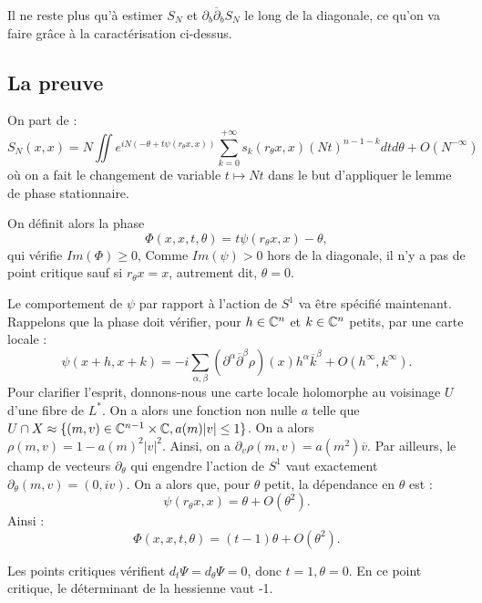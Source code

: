 Il ne reste plus qu'à estimer $S_N$ et $\partial_b \overline{\partial}_bS_N$ le long de la diagonale, ce qu'on va faire grâce à la caractérisation ci-dessus.

\subsection{La preuve}
On part de :
\begin{equation*}
	S_N(x,x)=N\iint e^{iN(-\theta + t\psi(r_{\theta}x,x))}\sum_{k=0}^{+\infty}s_k(r_{\theta}x,x)(Nt)^{n-1-k}dtd\theta + O(N^{-\infty})
\end{equation*}
où on a fait le changement de variable $t \mapsto Nt$ dans le but d'appliquer le lemme de phase stationnaire.

On définit alors la phase
\begin{equation*}
	\Phi(x,x,t,\theta)=t\psi(r_{\theta}x,x)-\theta,
\end{equation*}
qui vérifie $Im(\Phi) \geq 0$, Comme $Im(\psi) > 0$ hors de la diagonale, il n'y a pas de point critique sauf si $r_{\theta}x=x$, autrement dit, $\theta=0$.

Le comportement de $\psi$ par rapport à l'action de $S^1$ va être spécifié maintenant. Rappelons que la phase doit vérifier, pour $h\in \mathbb{C}^n$ et $k \in \mathbb{C}^n$ petits, par une carte locale :
\begin{equation}
  \psi(x+h,x+k) =-i\sum_{\alpha,\beta}(\partial^{\alpha}\overline{\partial}^{\beta}\rho)(x)h^{\alpha}\overline{k}^{\beta} + O(h^{\infty},k^{\infty}).
\end{equation}
Pour clarifier l'esprit, donnons-nous une carte locale holomorphe au voisinage $U$ d'une fibre de $L^*$. On a alors une fonction non nulle $a$ telle que $U \cap X \approx \{(m,v)\in \mathbb{C}^{n-1}\times \mathbb{C}, a(m)|v|\leq 1\}$. On a alors $\rho(m,v)=1-a(m)^2|v|^2$. Ainsi, on a $\partial_v \rho(m,v) = a(m^2)\overline{v}$.
Par ailleurs, le champ de vecteurs $\partial_{\theta}$ qui engendre l'action de $S^1$ vaut exactement $\partial_{\theta}(m,v)=(0,iv)$. On a alors que, pour $\theta$ petit, la dépendance en $\theta$ est :
\begin{equation*}
  \psi(r_{\theta} x,x) = \theta + O(\theta^{2}).
\end{equation*}
 Ainsi :
\begin{equation*}
	\Phi(x,x,t,\theta) =(t-1)\theta + O(\theta^2).
\end{equation*}

Les points critiques vérifient $d_t\Psi = d_\theta \Psi =0$, donc $t=1, \theta=0$. En ce point critique, le déterminant de la hessienne vaut -1.

